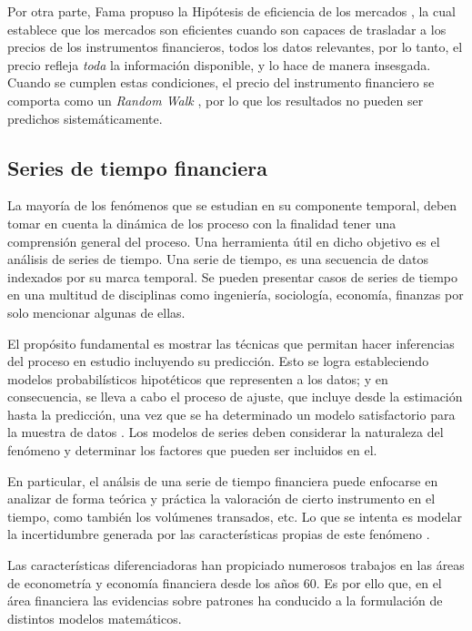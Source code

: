 Por otra parte, Fama propuso la Hipótesis de eficiencia de los mercados
\cite{malkiel2012efficient}, la cual establece que los mercados son eficientes
cuando son capaces de trasladar a los precios de los instrumentos financieros,
todos los datos relevantes, por lo tanto, el precio refleja \emph{toda} la
información disponible, y lo hace de manera insesgada. Cuando se cumplen estas
condiciones, el precio del instrumento financiero se comporta como un
\emph{Random Walk} \cite{fama1965random}, por lo que los resultados no pueden
ser predichos sistemáticamente.

\subsection{Series de tiempo financiera}

La mayoría de los fenómenos que se estudian en su componente temporal, deben
tomar en cuenta la dinámica de los proceso con la finalidad tener una
comprensión general del proceso. Una herramienta útil en dicho objetivo es el
análisis de series de tiempo. Una serie de tiempo, es una secuencia de datos
indexados por su marca temporal. Se pueden presentar casos de series de tiempo
en una multitud de disciplinas como ingeniería, sociología, economía, finanzas
por solo mencionar algunas de ellas.

El propósito fundamental es mostrar las técnicas que permitan hacer inferencias
del proceso en estudio incluyendo su predicción. Esto se logra estableciendo
modelos probabilísticos hipotéticos que representen a los datos; y en
consecuencia, se lleva a cabo el proceso de ajuste, que incluye desde la
estimación hasta la predicción, una vez que se ha determinado un modelo
satisfactorio para la muestra de datos \cite{box2011time}
\cite{vandaele1983applied}. Los modelos de series deben considerar la
naturaleza del fenómeno y determinar los factores que pueden ser incluidos en
el.

En particular, el análsis de una serie de tiempo financiera puede enfocarse en
analizar de forma teórica y práctica la valoración de cierto instrumento en el
tiempo, como también los volúmenes transados, etc. Lo que se intenta es modelar
la incertidumbre generada por las características propias de este fenómeno
\cite{tsay2005analysis}. 

Las características diferenciadoras han propiciado numerosos trabajos en las
áreas de econometría y economía financiera desde los años 60. Es por ello que,
en el área financiera las evidencias sobre patrones ha conducido a la
formulación de distintos modelos matemáticos.

